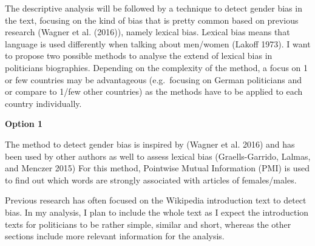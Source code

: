 \documentclass[
]{article}
\begin{document}
The descriptive analysis will be followed by a technique to detect
gender bias in the text, focusing on the kind of bias that is pretty
common based on previous research (Wagner et al. (2016)), namely lexical
bias. Lexical bias means that language is used differently when talking
about men/women (Lakoff 1973). I want to propose two possible methods to
analyse the extend of lexical bias in politicians biographies. Depending
on the complexity of the method, a focus on 1 or few countries may be
advantageous (e.g.~focusing on German politicians and or compare to
1/few other countries) as the methods have to be applied to each country
individually.

\textbf{Option 1}

The method to detect gender bias is inspired by (Wagner et al. 2016) and
has been used by other authors as well to assess lexical bias
(Graells-Garrido, Lalmas, and Menczer 2015) For this method, Pointwise
Mutual Information (PMI) is used to find out which words are strongly
associated with articles of females/males.

Previous research has often focused on the Wikipedia introduction text
to detect bias. In my analysis, I plan to include the whole text as I
expect the introduction texts for politicians to be rather simple,
similar and short, whereas the other sections include more relevant
information for the analysis.
\end{document}
